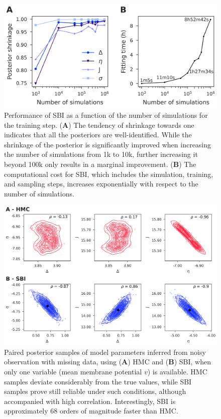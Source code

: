 \documentclass[preprint,11pt,authoryear]{elsarticle}
\begin{document}
\begin{figure}[ht]
    \centering
    \includegraphics[width=\linewidth]{Figs/FigS8.png}
    \renewcommand{\thefigure}{S\arabic{figure}}
    \caption{Performance of SBI as a function of the number of simulations for the training step. (\textbf{A}) The tendency of shrinkage towards one indicates that all the posteriors are well-identified. While the shrinkage of the posterior is significantly improved when increasing the number of simulations from 1k to 10k, further increasing it beyond 100k only results in a marginal improvement. (\textbf{B}) The computational cost for SBI, which includes the simulation, training, and sampling steps, increases exponentially with respect to the number of simulations. }
    \label{fig:SBI_ZandShrink}
\end{figure}



\begin{figure}
    \centering
    \includegraphics[width=\linewidth]{Figs/FigS9.png}
    \renewcommand{\thefigure}{S\arabic{figure}}
    \caption{Paired posterior samples of model parameters inferred from noisy observation with missing data, using (\textbf{A}) HMC and (\textbf{B}) SBI, when only one variable (mean membrane potential $v$) is available. HMC samples deviate considerably from the true values, while SBI samples prove still reliable under such conditions, although accompanied with high correlation. Interestingly, SBI is approximately 68 orders of magnitude faster than HMC.}
    \label{fig:SDE_missingdata_joint_posterior}
\end{figure}
\end{document}
